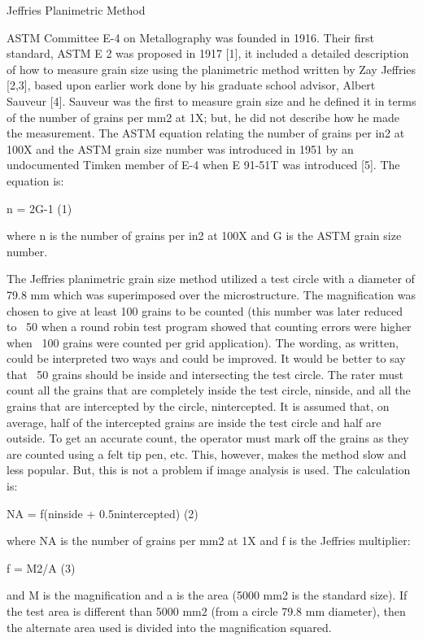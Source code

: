 \documentclass[10pt]{beamer}
\begin{document}
{%
\begin{frame}[fragile]{Jeffries Planimetric Method}

ASTM Committee E-4 on Metallography was founded in 1916. Their first standard, ASTM E 2 was proposed in 1917 [1], it included a detailed description of how to measure grain size using the planimetric method written by Zay Jeffries [2,3], based upon earlier work done by his graduate school advisor, Albert Sauveur [4]. Sauveur was the first to measure grain size and he defined it in terms of the number of grains per mm2 at 1X; but, he did not describe how he made the measurement. The ASTM equation relating the number of grains per in2 at 100X and the ASTM grain size number was introduced in 1951 by an undocumented Timken member of E-4 when E 91-51T was introduced [5]. The equation is:

n = 2G-1                                            (1)

where n is the number of grains per in2 at 100X and G is the ASTM grain size number.

The Jeffries planimetric grain size method utilized a test circle with a diameter of 79.8 mm which was superimposed over the microstructure. The magnification was chosen to give at least 100 grains to be counted (this number was later reduced to ~50 when a round robin test program showed that counting errors were higher when ~100 grains were counted per grid application). The wording, as written, could be interpreted two ways and could be improved. It would be better to say that ~50 grains should be inside and intersecting the test circle. The rater must count all the grains that are completely inside the test circle, ninside, and all the grains that are intercepted by the circle, nintercepted. It is assumed that, on average, half of the intercepted grains are inside the test circle and half are outside. To get an accurate count, the operator must mark off the grains as they are counted using a felt tip pen, etc. This, however, makes the method slow and less popular. But, this is not a problem if image analysis is used. The calculation is:

NA = f(ninside + 0.5nintercepted)                          (2)

where NA is the number of grains per mm2 at 1X and f is the Jeffries multiplier:

f = M2/A                                                     (3)

and M is the magnification and a is the area (5000 mm2 is the standard size). If the test area is different than 5000 mm2 (from a circle 79.8 mm diameter), then the alternate area used is divided into the magnification squared.


\end{frame}}
\end{document}
